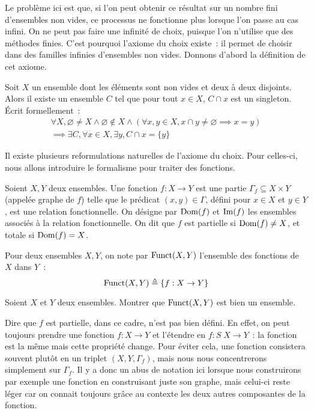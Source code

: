 Le problème ici est que, si l'on peut obtenir ce résultat sur un nombre fini
d'ensembles non vides, ce processus ne fonctionne plus lorsque l'on passe au cas
infini. On ne peut pas faire une infinité de choix, puisque l'on n'utilise que
des méthodes finies. C'est pourquoi l'axiome du choix existe~: il permet de
choisir dans des familles infinies d'ensembles non vides. Donnons d'abord la
définition de cet axiome.

\begin{axiom}[Choix]\label{ax.ZF.AC}
  Soit $X$ un ensemble dont les éléments sont non vides et deux à deux
  disjoints. Alors il existe un ensemble $C$ tel que pour tout $x\in X$,
  $C\cap x$ est un singleton. \'Ecrit formellement~:
  \begin{multline*}
  \forall X, \varnothing\neq X \land \varnothing\notin X \land
  (\forall x,y \in X, x \cap y \neq
  \varnothing \implies x = y)
  \\\implies \exists C, \forall x \in X, \exists y, C \cap x = \{y\}
  \end{multline*}
\end{axiom}

Il existe plusieurs reformulations naturelles de l'axiome du choix. Pour
celles-ci, nous allons introduire le formalisme pour traiter des fonctions.

\begin{definition}[Fonction]
  Soient $X,Y$ deux ensembles. Une fonction $f : X \to Y$ est une partie
  $\Gamma_f\subseteq X \times Y$ (appelée graphe de $f$)  telle que le prédicat
  $(x,y)\in \Gamma$, défini pour $x\in X$ et $y\in Y$, est une relation
  fonctionnelle. On désigne par $\operatorname{Dom}(f)$ et $\operatorname{Im}(f)$ les ensembles associés à
  la relation fonctionnelle. On dit que $f$ est partielle si $\operatorname{Dom}(f) \neq X$,
  et totale si $\operatorname{Dom}(f) = X$.

  Pour deux ensembles $X,Y$, on note par $\operatorname{Funct}(X,Y)$ l'ensemble des fonctions
  de $X$ dans $Y$~:
  \[\operatorname{Funct}(X,Y) \triangleq \{f : X \to Y\}\]
\end{definition}

\begin{exercise}
  Soient $X$ et $Y$ deux ensembles. Montrer que $\operatorname{Funct}(X,Y)$ est bien un
  ensemble.
\end{exercise}

\begin{remark}
  Dire que $f$ est partielle, dans ce cadre, n'est pas bien défini. En effet, on
  peut toujours prendre une fonction $f : X \to Y$ et l'étendre en
  $f : S\;X \to Y$~: la fonction est la même mais cette propriété change. Pour
  éviter cela, une fonction consistera souvent plutôt en un triplet
  $(X,Y,\Gamma_f)$, mais nous nous concentrerons simplement sur $\Gamma_f$. Il y
  a donc un abus de notation ici lorsque nous construirons par exemple une
  fonction en construisant juste son graphe, mais celui-ci reste léger car on
  connait toujours grâce au contexte les deux autres composantes de la fonction.
\end{remark}

